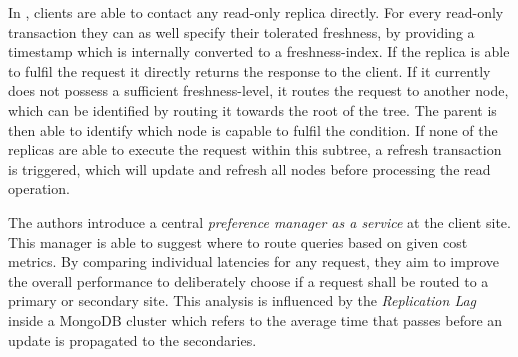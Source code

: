 In \cite{voicu:2010}, clients are able to contact any read-only replica directly. For every read-only transaction they can as well specify
their tolerated freshness, by providing a timestamp which is internally converted to a freshness-index. If the replica is able to fulfil the request 
it directly returns the response to the client. If it currently does not possess a sufficient freshness-level, it routes the request to another node, which can be identified 
by routing it towards the root of the tree. The parent is then able to identify which node is capable to fulfil the condition.  
If none of the replicas are able to execute the request within this subtree, a refresh transaction is triggered, which will update and refresh all nodes before 
processing the read operation.

The authors \cite{huang:2020} introduce a central \emph{preference manager as a service} at the client site. This manager is able to suggest where to route queries 
based on given cost metrics. By comparing individual latencies for any request, they aim to improve the overall performance to deliberately choose if a request 
shall be routed to a primary or secondary site. This analysis is influenced by the \emph{Replication Lag} inside a MongoDB cluster which refers to the average time 
that passes before an update is propagated to the secondaries. 




